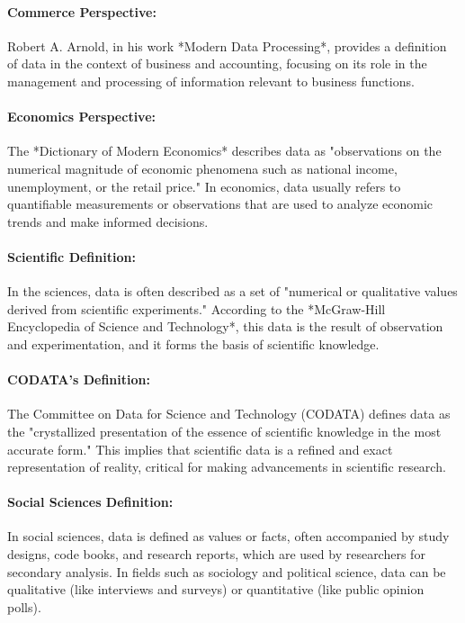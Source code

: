 \documentclass[12pt, oneside]{book}
\begin{document}
\paragraph{Commerce Perspective:}
Robert A. Arnold, in his work *Modern Data Processing*, provides a definition of data in the context of business and accounting, focusing on its role in the management and processing of information relevant to business functions.\\
\paragraph{Economics Perspective:}
The *Dictionary of Modern Economics* describes data as "observations on the numerical magnitude of economic phenomena such as national income, unemployment, or the retail price." In economics, data usually refers to quantifiable measurements or observations that are used to analyze economic trends and make informed decisions.\\
\paragraph{Scientific Definition:}
In the sciences, data is often described as a set of "numerical or qualitative values derived from scientific experiments." According to the *McGraw-Hill Encyclopedia of Science and Technology*, this data is the result of observation and experimentation, and it forms the basis of scientific knowledge.\\
\paragraph{CODATA's Definition:}
The Committee on Data for Science and Technology (CODATA) defines data as the "crystallized presentation of the essence of scientific knowledge in the most accurate form." This implies that scientific data is a refined and exact representation of reality, critical for making advancements in scientific research.\\
\paragraph{Social Sciences Definition:}
In social sciences, data is defined as values or facts, often accompanied by study designs, code books, and research reports, which are used by researchers for secondary analysis. In fields such as sociology and political science, data can be qualitative (like interviews and surveys) or quantitative (like public opinion polls).\\
\end{document}

